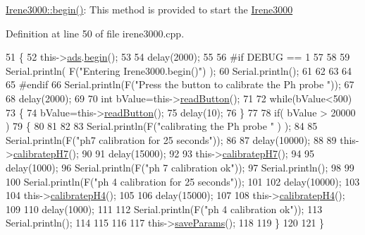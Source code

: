 \hyperlink{class_irene3000_ad5891806c500ae1007afe52b9e304c2b}{Irene3000\+::begin()}\+: This method is provided to start the \hyperlink{class_irene3000}{Irene3000} 

Definition at line 50 of file irene3000.\+cpp.


\begin{DoxyCode}
51 \{
52     this->\hyperlink{class_irene3000_a1215e77ba761c9908d80d691f149e135}{ads}.\hyperlink{class_adafruit___a_d_s1015_a6eba7c3cd854927f60883bb371e5faa6}{begin}();
53 
54     delay(2000);
55 
56 \textcolor{preprocessor}{#if DEBUG == 1 }
57 
58 
59     Serial.println( F(\textcolor{stringliteral}{"Entering Irene3000.begin()"}) );
60     Serial.println();
61     
62     
63     
64 
65 \textcolor{preprocessor}{#endif}
66     Serial.println(F(\textcolor{stringliteral}{"Press the button to calibrate the Ph probe "}));
67 
68     delay(2000);
69 
70     \textcolor{keywordtype}{int} bValue=this->\hyperlink{class_irene3000_a78a87eb7cf295b95c12b2ebd51c2bb77}{readButton}();
71     
72     \textcolor{keywordflow}{while}(bValue<500)
73     \{
74         bValue=this->\hyperlink{class_irene3000_a78a87eb7cf295b95c12b2ebd51c2bb77}{readButton}();
75         delay(10);  
76     \}
77 
78     \textcolor{keywordflow}{if}(  bValue > 20000 )
79     \{
80     
81 
82         
83         Serial.println(F(\textcolor{stringliteral}{"calibrating the Ph probe "} ) );
84         
85         Serial.println(F(\textcolor{stringliteral}{"ph7 calibration for 25 seconds"}));
86         
87         delay(10000);
88         
89         this->\hyperlink{class_irene3000_a1d3299202e4cb7afcff9c9e3e95d94c1}{calibratepH7}();
90 
91         delay(15000);       
92     
93         this->\hyperlink{class_irene3000_a1d3299202e4cb7afcff9c9e3e95d94c1}{calibratepH7}();
94 
95         delay(1000);
96         Serial.println(F(\textcolor{stringliteral}{"ph 7 calibration ok"}));
97         Serial.println();
98     
99 
100         Serial.println(F(\textcolor{stringliteral}{"ph 4 calibration for 25 seconds"}));
101     
102         delay(10000);       
103 
104         this->\hyperlink{class_irene3000_aa140dd026922a04981edfd04d46cabbe}{calibratepH4}();
105 
106         delay(15000);
107         
108         this->\hyperlink{class_irene3000_aa140dd026922a04981edfd04d46cabbe}{calibratepH4}();
109     
110         delay(1000);        
111 
112         Serial.println(F(\textcolor{stringliteral}{"ph 4 calibration ok"}));
113         Serial.println();
114     
115 
116 
117         this->\hyperlink{class_irene3000_a63dbd38e79b8cd5f1fba4b245501a894}{saveParams}();
118     
119     \}
120 
121 \}
\end{DoxyCode}
